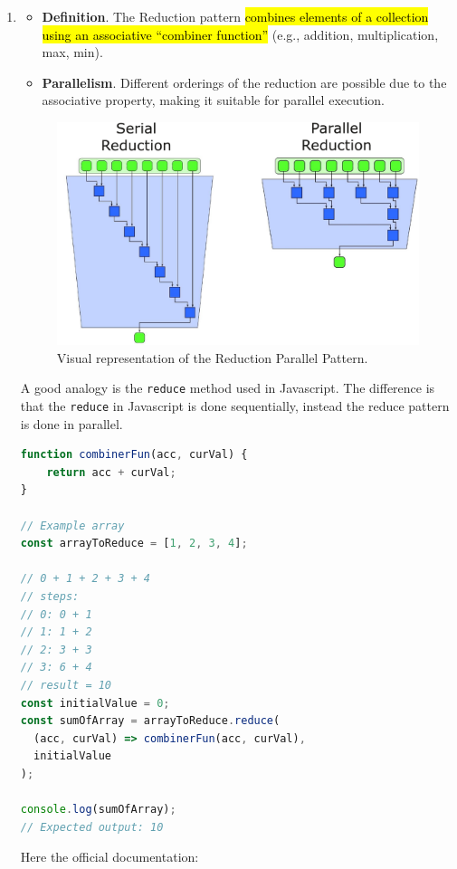 \begin{enumerate}
    \item {}
    \begin{itemize}
        \item[\textcolor{Red2}{\faIcon{book}}] \textcolor{Red2}{\textbf{Definition}}. The Reduction pattern \hl{combines elements of a collection using an associative ``combiner function''} (e.g., addition, multiplication, max, min).

        \item[\textcolor{Green3}{\faIcon{tachometer-alt}}] \textcolor{Green3}{\textbf{Parallelism}}. Different orderings of the reduction are possible due to the associative property, making it suitable for parallel execution.
    \end{itemize}
    \begin{figure}[!htp]
        \centering
        \includegraphics[width=.84\textwidth]{img/reduction-pattern-1.pdf}
        \caption{Visual representation of the Reduction Parallel Pattern.}
    \end{figure}
    \begin{examplebox}
        A good analogy is the \texttt{reduce} method used in Javascript. The difference is that the \texttt{reduce} in Javascript is done sequentially, instead the reduce pattern is done in parallel.
        \begin{lstlisting}[language=JavaScript]
function combinerFun(acc, curVal) {
    return acc + curVal;
}

// Example array
const arrayToReduce = [1, 2, 3, 4];

// 0 + 1 + 2 + 3 + 4
// steps:
// 0: 0 + 1
// 1: 1 + 2
// 2: 3 + 3
// 3: 6 + 4
// result = 10
const initialValue = 0;
const sumOfArray = arrayToReduce.reduce(
  (acc, curVal) => combinerFun(acc, curVal),
  initialValue
);

console.log(sumOfArray);
// Expected output: 10\end{lstlisting}
        Here the official documentation:
        \begin{center}
        \end{center}
    \end{examplebox}



\end{enumerate}
